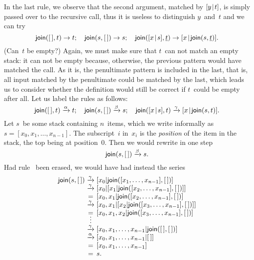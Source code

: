 In the last rule, we observe that the second argument, matched by
\([{y}\!\mid\!{t}]\), is simply passed over to the recursive call, thus it
is useless to distinguish \(y\)~and~\(t\) and we can try
\begin{equation*}
\textsf{join}([\,],t) \rightarrow t;\quad
\textsf{join}(s,[\,]) \rightarrow s;\quad
\textsf{join}([{x}\!\mid\!{s}],\underline{t}) \rightarrow
[{x}\!\mid\!{\textsf{join}(s,\underline{t})}].
\end{equation*}
(Can~\(t\) be empty?) Again, we must make sure that \(t\)~can not
match an empty stack: it can not be empty because, otherwise, the
previous pattern would have matched the call. As it is, the
penultimate pattern is included in the last, that is, all input
matched by the penultimate could be matched by the last, which leads
us to consider whether the definition would still be correct if
\(t\)~could be empty after all. Let us label the rules as follows:
\begin{equation*}
\textsf{join}([\,],t) \xrightarrow{\smash{\alpha}} t;\quad
\textsf{join}(s,[\,]) \xrightarrow{\smash{\beta}} s;\quad
\textsf{join}([{x}\!\mid\!{s}],t) \xrightarrow{\smash{\gamma}}
[{x}\!\mid\!{\textsf{join}(s,t)}].
\end{equation*}
Let \(s\)~be some stack containing \(n\)~items, which we write
informally as \(s = [x_0, x_1, \dots, x_{n-1}]\). The subscript~\(i\)
in~\(x_i\) is the \emph{position} of the item in the stack, the top
being at position~\(0\). Then we would rewrite in one step
\begin{equation*}
\textsf{join}(s,[\,]) \xrightarrow{\smash{\beta}} s.
\end{equation*}
Had rule~\clause{\beta} been erased, we would have had instead the
series
\begin{equation*}
\begin{array}{r@{\;}c@{\;}l}
\fun{join}(s,\el)
& \smashedrightarrow{\gamma} &
  [x\sb{0}|\fun{join}([x\sb{1},\ldots,x\sb{n-1}],\el)]\\
& \smashedrightarrow{\gamma} &
  [x\sb{0}|[x\sb{1}|\fun{join}([x\sb{2},\ldots,x\sb{n-1}],\el)]]\\
& = & [x\sb{0},x\sb{1}|\fun{join}([x\sb{2},\ldots,x\sb{n-1}],\el)]\\
& \smashedrightarrow{\gamma} &
  [x\sb{0},x\sb{1}|[x\sb{2}|\fun{join}([x\sb{3},\ldots,x\sb{n-1}],\el)]]\\
& = & [x\sb{0},x\sb{1},x\sb{2}|\fun{join}([x\sb{3},\ldots,x\sb{n-1}],\el)]\\
& \smash{\vdots} &\\
& \smashedrightarrow{\gamma} &
  [x\sb{0},x\sb{1},\ldots,x\sb{n-1}|\fun{join}(\el,\el)]\\
& \smashedrightarrow{\alpha} & [x\sb{0},x\sb{1},\ldots,x\sb{n-1}|\el]\\
& = & [x\sb{0},x\sb{1},\ldots,x\sb{n-1}]\\
& = & s.
\end{array}
\end{equation*}
